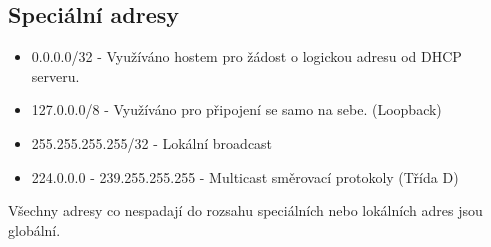 \subsection{Speciální adresy}
\begin{itemize}
  \item 0.0.0.0/32 - Využíváno hostem pro žádost o logickou adresu od DHCP serveru.
  \item 127.0.0.0/8 - Využíváno pro připojení se samo na sebe. (Loopback)
  \item 255.255.255.255/32 - Lokální broadcast
  \item 224.0.0.0 - 239.255.255.255 - Multicast směrovací protokoly (Třída D)
\end{itemize}
Všechny adresy co nespadají do rozsahu speciálních nebo lokálních adres jsou globální.
